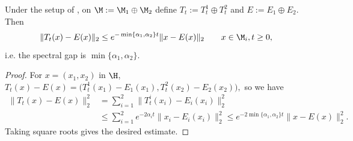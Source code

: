 \documentclass[sn-mathphys-num]{sn-jnl}
\begin{document}
\begin{proposition}\label{prop:Gap-sum}
Under the setup of , on
$\M:=\M_1\oplus\M_2$ define $T_t:=T^1_t\oplus T^2_t$ and $E:=E_1\oplus E_2$.  Then
\[
\|T_t(x)-E(x)\|_2
 \le
e^{-\min\{\alpha_1,\alpha_2\}t}
  \|x-E(x)\|_2 \qquad
   x\in\M_i, t\ge0,
\]
i.e. the spectral gap is $\min\{\alpha_1,\alpha_2\}$.
\end{proposition}
\begin{proof}
For $x=(x_1,x_2)$ in $\H$, $T_t(x)-E(x)
=\bigl(T^1_t(x_1)-E_1(x_1),  T^2_t(x_2)-E_2(x_2)\bigr),$
so we have
\begin{align*}
  \|T_t(x)-E(x)\|_2^2
&=\sum_{i=1}^2\|T^i_t(x_i)-E_i(x_i)\|_2^2\\
&\le
\sum_{i=1}^2e^{-2\alpha_i t}  \|x_i-E_i(x_i)\|_2^2
\le
e^{-2\min\{\alpha_1,\alpha_2\}t}  \|x-E(x)\|_2^2.
\end{align*}
Taking square roots gives the desired estimate.
\end{proof}
\end{document}
